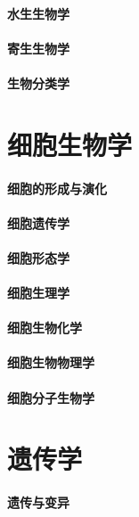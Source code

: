 \documentclass[UTF8]{../NatureUniverse}
\begin{document}
\subsubsection{水生生物学}
\subsubsection{寄生生物学}
\subsubsection{生物分类学}






\chapter{细胞生物学}
\subsubsection{细胞的形成与演化}
\subsubsection{细胞遗传学}
\subsubsection{细胞形态学}
\subsubsection{细胞生理学}
\subsubsection{细胞生物化学}
\subsubsection{细胞生物物理学}
\subsubsection{细胞分子生物学}






\chapter{遗传学}
\subsubsection{遗传与变异}
\end{document}
